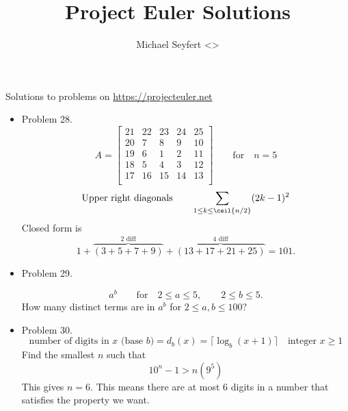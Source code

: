 \documentclass[12pt]{article}
\newcommand{\colize}[1]{\color{medium-blue}#1\color{black}}
\begin{document}
\title{Project Euler Solutions}
\author{Michael Seyfert <\href{mailto:\myemail}{\myemail}>}
\maketitle
Solutions to problems on \url{https://projecteuler.net}

\begin{itemize}
\colize{\item} Problem 28.
\[
A =
\begin{bmatrix}
21 & 22 & 23 & 24 & 25 \\
20 &  7 &  8 &  9 & 10 \\
19 &  6 &  1 &  2 & 11 \\
18 &  5 &  4 &  3 & 12 \\
17 & 16 & 15 & 14 & 13 \\
\end{bmatrix}
\qquad \text{for} \quad n =5
\]
\begin{align*}
  \text{Upper right diagonals}&\qquad \sum_{1 \le k \le \ceil{n/2}} (2k-1)^2 \\
\end{align*}
Closed form is
\[
1 + \overbrace{(3 + 5 + 7 + 9)}^{2\text{ diff}} + \overbrace{(13 + 17 + 21 + 25)}^{4\text{ diff}} = 101.
\]

\colize{\item} Problem 29.

\[
a^b \qquad\text{for}\quad 2 \le a \le 5,\qquad 2 \le b \le 5.
\]
How many distinct terms are in $a^b$ for $2 \le a,b \le 100$?

\colize{\item} Problem 30.
\[
\text{number of digits in $x$ (base $b$)} = d_b(x) = \lceil\log_b(x+1)\rceil \quad \text{integer } x \ge 1
\]
Find the smallest $n$ such that
\[10^n - 1 > n(9^5)\]
This gives $n = 6$. This means there are at most $6$ digits in a number
that satisfies the property we want.

\end{itemize}

\end{document}
